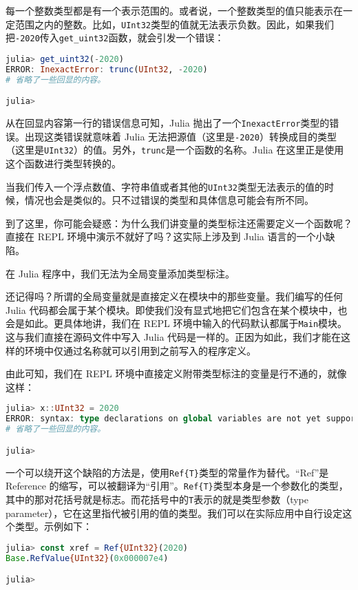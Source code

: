每一个整数类型都是有一个表示范围的。或者说，一个整数类型的值只能表示在一定范围之内的整数。比如，\verb`UInt32`类型的值就无法表示负数。因此，如果我们把\verb`-2020`传入\verb`get_uint32`函数，就会引发一个错误：

\begin{lstlisting}[language=julia]
julia> get_uint32(-2020)
ERROR: InexactError: trunc(UInt32, -2020)
# 省略了一些回显的内容。

julia>  
\end{lstlisting}

从在回显内容第一行的错误信息可知，Julia 抛出了一个\verb`InexactError`类型的错误。出现这类错误就意味着 Julia 无法把源值（这里是\verb`-2020`）转换成目的类型（这里是\verb`UInt32`）的值。另外，\verb`trunc`是一个函数的名称。Julia 在这里正是使用这个函数进行类型转换的。

当我们传入一个浮点数值、字符串值或者其他的\verb`UInt32`类型无法表示的值的时候，情况也会是类似的。只不过错误的类型和具体信息可能会有所不同。

到了这里，你可能会疑惑：为什么我们讲变量的类型标注还需要定义一个函数呢？直接在 REPL 环境中演示不就好了吗？这实际上涉及到 Julia 语言的一个小缺陷。

在 Julia 程序中，我们无法为全局变量添加类型标注。

还记得吗？所谓的全局变量就是直接定义在模块中的那些变量。我们编写的任何 Julia 代码都会属于某个模块。即使我们没有显式地把它们包含在某个模块中，也会是如此。更具体地讲，我们在 REPL 环境中输入的代码默认都属于\verb`Main`模块。这与我们直接在源码文件中写入 Julia 代码是一样的。正因为如此，我们才能在这样的环境中仅通过名称就可以引用到之前写入的程序定义。

由此可知，我们在 REPL 环境中直接定义附带类型标注的变量是行不通的，就像这样：

\begin{lstlisting}[language=julia]
julia> x::UInt32 = 2020
ERROR: syntax: type declarations on global variables are not yet supported
# 省略了一些回显的内容。

julia> 
\end{lstlisting}

一个可以绕开这个缺陷的方法是，使用\verb`Ref{T}`类型的常量作为替代。“Ref”是 Reference 的缩写，可以被翻译为“引用”。\verb`Ref{T}`类型本身是一个参数化的类型，其中的那对花括号就是标志。而花括号中的\verb`T`表示的就是类型参数（type parameter），它在这里指代被引用的值的类型。我们可以在实际应用中自行设定这个类型。示例如下：

\begin{lstlisting}[language=julia]
julia> const xref = Ref{UInt32}(2020)
Base.RefValue{UInt32}(0x000007e4)

julia> 
\end{lstlisting}

